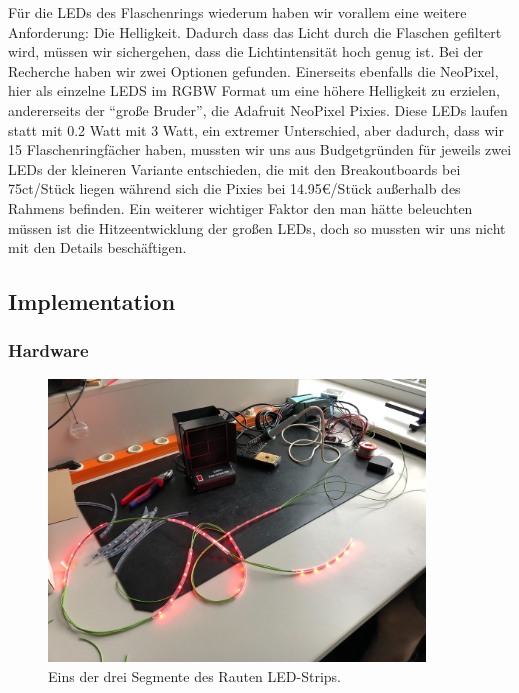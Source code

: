         Für die LEDs des Flaschenrings wiederum haben wir vorallem eine weitere Anforderung: Die Helligkeit. Dadurch dass das Licht durch die Flaschen gefiltert wird, müssen wir sichergehen, dass die Lichtintensität hoch genug ist. Bei der Recherche haben wir zwei Optionen gefunden.
        Einerseits ebenfalls die NeoPixel, hier als einzelne LEDS im RGBW Format um eine höhere Helligkeit zu erzielen, andererseits der \enquote{große Bruder}, die Adafruit NeoPixel Pixies. Diese LEDs laufen statt mit 0.2 Watt mit 3 Watt, ein extremer Unterschied, aber dadurch, dass wir 15 Flaschenringfächer haben, mussten wir uns aus Budgetgründen für jeweils zwei LEDs der kleineren Variante entschieden, die mit den Breakoutboards bei 75ct/Stück liegen während sich die Pixies bei 14.95€/Stück außerhalb des Rahmens befinden. Ein weiterer wichtiger Faktor den man hätte beleuchten müssen ist die Hitzeentwicklung der großen LEDs, doch so mussten wir uns nicht mit den Details beschäftigen.


    \subsection{Implementation}

        \subsubsection{Hardware}

            \begin{figure}[H]
                \begin{center}
                    \includegraphics[width=10cm]{media/03_technical_implementation/picture_led_strip.jpg}
                \end{center}
                \caption{Eins der drei Segmente des Rauten LED-Strips.}
                \label{fig:picture_led_strip}
            \end{figure}

